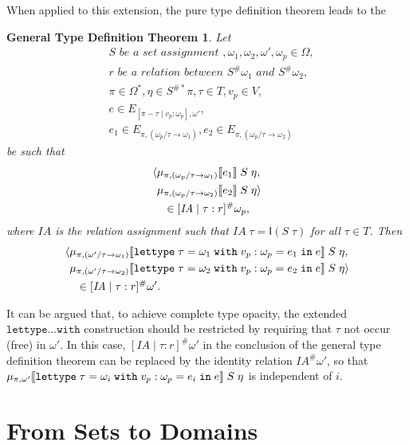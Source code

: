 \documentclass[sigplan,screen,nonacm,balance=false]{acmart}
\theoremstyle{plain}
\DeclarePairedDelimiter{\pair}{\langle}{\rangle}
\DeclarePairedDelimiter{\interp}{\llbracket}{\rrbracket}
\newcommand{\lettype}{\mathtt{lettype}}
\newcommand{\with}{\mathtt{with}}
\newcommand{\letwith}[6]{\mathtt{lettype} \; #1 = #2 \; \mathtt{with} \; #3 : #4 = #5 \; \mathtt{in} \; #6}
\newcommand{\Id}{\mathsf{I}}
\newcommand{\IA}{\mathit{IA}}
\begin{document}
When applied to this extension, the pure type definition theorem leads to the

\newtheorem*{gentypedef}{General Type Definition Theorem}
\begin{gentypedef}
Let
%
\begin{align*}
  & S \textit{ be a set assignment }, \omega_1, \omega_2, \omega', \omega_p \in \Omega, \\
  & r \textit{ be a relation between } S^\# \omega_1 \textit{ and } S^\# \omega_2, \\
  & \pi \in \Omega^*, \eta \in S^{\#*} \pi, \tau \in T, v_p \in V, \\
  & e \in E_{[\pi - \tau \mid v_p : \omega_p], \omega'}, \\
  & e_1 \in E_{\pi, (\omega_p/\tau \to \omega_1)}, e_2 \in E_{\pi, (\omega_p/\tau \to \omega_2)}
\end{align*}
%
be such that
%
\begin{align*}
  &\pair{\mu_{\pi, (\omega_p/\tau \to \omega_1)} \interp{e_1} \; S \; \eta, \\
  &\phantom{\langle} \mu_{\pi, (\omega_p/\tau \to \omega_2)} \interp{e_2} \; S \; \eta} \\
  &\quad \in [\IA \mid \tau : r]^\# \omega_p,
\end{align*}
%
where $\IA$ is the relation assignment such that $\IA \; \tau = \Id(S \; \tau)$ for all $\tau \in T$.
Then
%
\begin{align*}
  &\pair{\mu_{\pi, (\omega'/\tau \to \omega_1)} \interp{\letwith{\tau}{\omega_1}{v_p}{\omega_p}{e_1}{e}} \; S \; \eta, \\
  &\phantom{\langle} \mu_{\pi, (\omega'/\tau \to \omega_2)} \interp{\letwith{\tau}{\omega_2}{v_p}{\omega_p}{e_2}{e}} \; S \; \eta} \\
  &\quad \in [\IA \mid \tau : r]^\# \omega'.
\end{align*}
\end{gentypedef}

It can be argued that, to achieve complete type opacity, the extended $\lettype \dots \with$ construction should be restricted by requiring that $\tau$ not occur (free) in $\omega'$.
In this case, $[\IA \mid \tau : r]^\# \omega'$ in the conclusion of the general type definition theorem can be replaced by the identity relation $\IA^\# \omega'$, so that
$\mu_{\pi, \omega'} \interp{\letwith{\tau}{\omega_i}{v_p}{\omega_p}{e_i}{e}} \; S \; \eta$
is independent of $i$.

\section{From Sets to Domains}
\end{document}
